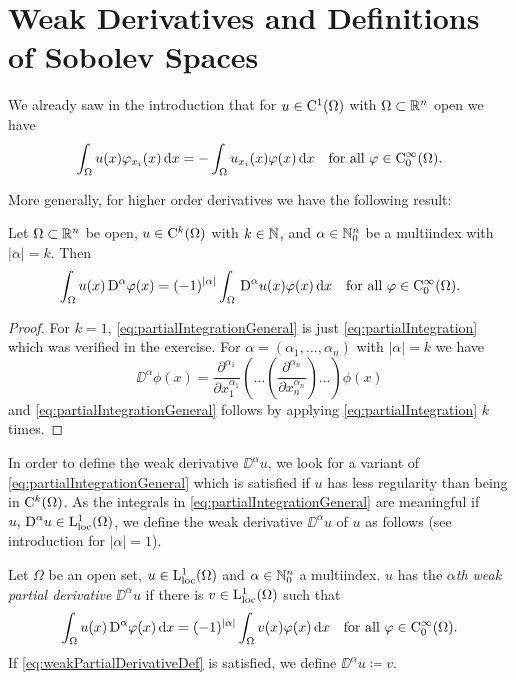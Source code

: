 \chapter{Weak Derivatives and Definitions of Sobolev Spaces}

We already saw in the introduction that for $u \in \mathrm{C}^1(\Omega)$ with $\Omega \subset \mathbb{R}^n$ open we have 
\begin{equation}
  \label{eq:partialIntegration}
  \int_\Omega u(x) \varphi_{x_i}(x) \, {\operatorname{d}\!{x}} = -\int_\Omega u_{x_i}(x) \varphi(x) \, {\operatorname{d}\!{x}} \quad \text{for all } \varphi \in \mathrm{C}_0^\infty(\Omega).
\end{equation}

More generally, for higher order derivatives we have the following result:
\begin{lem}
  \label{lem:partialIntegrationGeneral}
  Let $\Omega \subset \mathbb{R}^n$ be open, $u \in \mathrm{C}^k(\Omega)$ with $k \in \mathbb{N}$, and $\alpha \in \mathbb{N}_0^n$ be a multiindex with $|\alpha| = k$. Then
  \begin{equation}
    \label{eq:partialIntegrationGeneral}
    \int_\Omega u(x) \,{\operatorname{D}}^\alpha \varphi(x) = (-1)^{|\alpha|} \int_\Omega \,{\operatorname{D}}^\alpha u(x) \varphi(x) \, {\operatorname{d}\!{x}} \quad\text{for all } \varphi \in \mathrm{C}_0^\infty(\Omega).
  \end{equation}
\end{lem}

\begin{proof}
  For $k = 1$, \eqref{eq:partialIntegrationGeneral} is just \eqref{eq:partialIntegration} which was verified in the exercise.
  For $\alpha = (\alpha_1,\dots,\alpha_n)$ with $|\alpha| = k$ we have
  $$
  \DD^\alpha \phi(x)= \frac{\partial^{\alpha_1}}{\partial x_1^{\alpha_1}} ( \dots ( \frac{\partial^{\alpha_n}}{\partial x_n^{\alpha_n}} ) \dots )\phi(x)
  $$
  and \eqref{eq:partialIntegrationGeneral} follows by applying \eqref{eq:partialIntegration} $k$ times.
\end{proof}

In order to define the weak derivative $\DD^\alpha u$, we look for a variant of \eqref{eq:partialIntegrationGeneral} which is satisfied if $u$ has less regularity than being in $\mathrm{C}^k(\Omega)$.
As the integrals in \eqref{eq:partialIntegrationGeneral} are meaningful if $u, \,{\operatorname{D}}^\alpha u \in \mathrm{L}^1_{\operatorname{loc}}(\Omega)$, we define the weak derivative $\DD^\alpha u$ of $u$ as follows (see introduction for $|\alpha| = 1$).

\begin{defn}
  \label{defn:weakPartialDerivative}
  Let $\Omega$ be an open set, $u \in \mathrm{L}^1_{\operatorname{loc}}(\Omega)$ and $\alpha \in \mathbb{N}_0^n$ a multiindex. 
  $u$ has the \emph{$\alpha$th weak partial derivative}  $\DD^\alpha u$ if there is $v \in \mathrm{L}_{\operatorname{loc}}^1(\Omega)$ such that
  \begin{equation}
    \label{eq:weakPartialDerivativeDef}
    \int_\Omega u(x) \,{\operatorname{D}}^\alpha \varphi(x) \, {\operatorname{d}\!{x}} = (-1)^{|\alpha|} \int_\Omega v(x) \varphi(x) \, {\operatorname{d}\!{x}} \quad \text{for all } \varphi \in \mathrm{C}_0^\infty(\Omega).
  \end{equation}
If \eqref{eq:weakPartialDerivativeDef} is satisfied, we define $\DD^\alpha u \coloneqq v$.
\end{defn}

